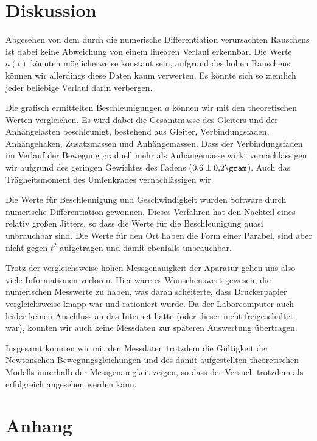 \documentclass[a4paper,german,12pt,smallheadings]{scrartcl}
\begin{document}
\section*{Diskussion}
Abgesehen
von dem durch die numerische Differentiation verursachten Rauschens ist dabei
keine Abweichung von einem linearen Verlauf erkennbar. Die Werte $a(t)$ könnten
möglicherweise konstant sein, aufgrund des hohen Rauschens können wir
allerdings diese Daten kaum verwerten. Es könnte sich so ziemlich jeder
beliebige Verlauf darin verbergen.

Die grafisch ermittelten Beschleunigungen $a$ können wir mit den theoretischen
Werten vergleichen. Es wird dabei die Gesamtmasse des Gleiters und der
Anhängelasten beschleunigt, bestehend aus Gleiter, Verbindungsfaden,
Anhängehaken, Zusatzmassen und Anhängemassen. Dass der Verbindungsfaden im
Verlauf der Bewegung graduell mehr als Anhängemasse wirkt vernachlässigen wir
aufgrund des geringen Gewichtes des Fadens ($0{,}6 \pm 0{,}2 \gram$). Auch das
Trägheitsmoment des Umlenkrades vernachlässigen wir.

Die Werte für Beschleunigung und Geschwindigkeit wurden Software durch
numerische Differentiation gewonnen. Dieses Verfahren hat den Nachteil eines
relativ großen Jitters, so dass die Werte für die Beschleunigung quasi
unbrauchbar sind. Die Werte für den Ort haben die Form einer Parabel, sind aber
nicht gegen $t^2$ aufgetragen und damit ebenfalls unbrauchbar.

Trotz der vergleichsweise hohen Messgenauigkeit der Aparatur gehen uns also
viele Informationen verloren. Hier wäre es Wünschenswert gewesen, die
numerischen Messwerte zu haben, was daran scheiterte, dass Druckerpapier
vergleichsweise knapp war und rationiert wurde. Da der Laborcomputer auch
leider keinen Anschluss an das Internet hatte (oder dieser nicht freigeschaltet
war), konnten wir auch keine Messdaten zur späteren Auswertung übertragen.

Insgesamt konnten wir mit den Messdaten trotzdem die Gültigkeit der Newtonschen
Bewegungsgleichungen und des damit aufgestellten theoretischen Modells
innerhalb der Messgenauigkeit zeigen, so dass der Versuch trotzdem als
erfolgreich angesehen werden kann.

\newpage
\begin{landscape}
  
\end{landscape}

\newpage
\section*{Anhang}
\lstset{basicstyle=\footnotesize\ttfamily,breaklines=true}
\lstset{numbers=left, frame=single}
\end{document}
